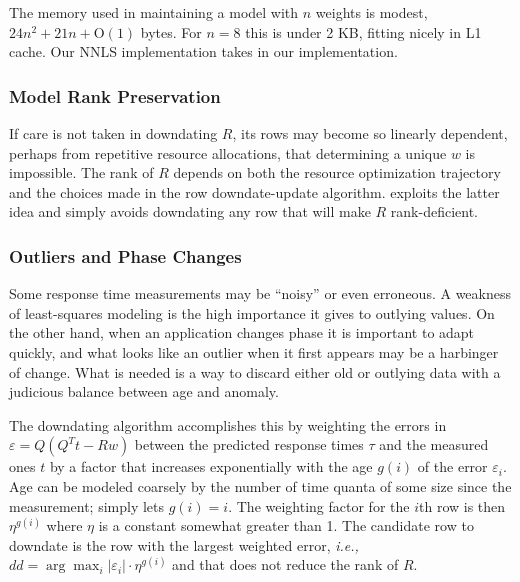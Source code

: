 The memory used in maintaining a model with $n$ weights is modest, $24n^2 + 21n + \textrm{O}(1)$ bytes.
For $n = 8$ this is under 2 KB, fitting nicely in L1 cache.
Our NNLS implementation takes  in our \tess implementation.

\subsubsection*{Model Rank Preservation}
If care is not taken in downdating $R$, its rows may become so linearly dependent,
perhaps from repetitive resource allocations,
that determining a unique $w$ is impossible.
The rank of $R$ depends on both the resource optimization trajectory and the
choices made in the row downdate-update algorithm.
\pacora exploits the latter idea and simply avoids downdating any row that will make $R$ rank-deficient.

\subsubsection*{Outliers and Phase Changes}


Some response time measurements may be ``noisy'' or even erroneous.
A weakness of least-squares modeling is the high importance it gives to outlying values.
On the other hand, when an application changes phase it is important to adapt quickly,
and what looks like an outlier when it first appears may be a harbinger of change.
What is needed is a way to discard either old or outlying data
with a judicious balance between age and anomaly.

The downdating algorithm accomplishes this by weighting the errors in $\varepsilon = Q(Q^Tt - Rw)$
between the predicted response times $\tau$ and the measured ones $t$ by a factor
that increases exponentially with the age $g(i)$ of the error $\varepsilon_i$.
Age can be modeled coarsely by the number of time quanta of some size since the measurement;
\pacora simply lets $g(i) = i$.
The weighting factor for the $i$th row is then $\eta^{g(i)}$ where $\eta$ is a constant somewhat greater than 1.
The candidate row to downdate is the row with the largest weighted error, \emph{i.e.,}
$dd = \arg\max_i |\varepsilon_i| \cdot \eta^{g(i)}$ and that does not reduce the rank of $R$.


